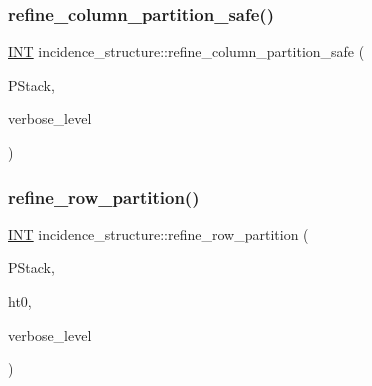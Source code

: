 \mbox{\label{classincidence__structure_a958f8ddce2d53753adb1df588bf0e721}} 
\subsubsection{\texorpdfstring{refine\+\_\+column\+\_\+partition\+\_\+safe()}{refine\_column\_partition\_safe()}}
{\footnotesize\ttfamily \mbox{\hyperlink{galois_8h_a09fddde158a3a20bd2dcadb609de11dc}{I\+NT}} incidence\+\_\+structure\+::refine\+\_\+column\+\_\+partition\+\_\+safe (\begin{DoxyParamCaption}\item[{\mbox{\hyperlink{classpartitionstack}{partitionstack}} \&}]{P\+Stack,  }\item[{\mbox{\hyperlink{galois_8h_a09fddde158a3a20bd2dcadb609de11dc}{I\+NT}}}]{verbose\+\_\+level }\end{DoxyParamCaption})}

\mbox{\label{classincidence__structure_a6e1419be9f59e69fd83b44e6b11905ea}} 
\subsubsection{\texorpdfstring{refine\+\_\+row\+\_\+partition()}{refine\_row\_partition()}}
{\footnotesize\ttfamily \mbox{\hyperlink{galois_8h_a09fddde158a3a20bd2dcadb609de11dc}{I\+NT}} incidence\+\_\+structure\+::refine\+\_\+row\+\_\+partition (\begin{DoxyParamCaption}\item[{\mbox{\hyperlink{classpartitionstack}{partitionstack}} \&}]{P\+Stack,  }\item[{\mbox{\hyperlink{galois_8h_a09fddde158a3a20bd2dcadb609de11dc}{I\+NT}}}]{ht0,  }\item[{\mbox{\hyperlink{galois_8h_a09fddde158a3a20bd2dcadb609de11dc}{I\+NT}}}]{verbose\+\_\+level }\end{DoxyParamCaption})}

